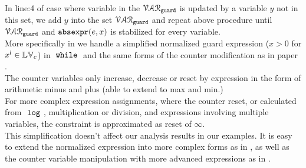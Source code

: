   In line:4 of case where variable in the $\mathcal{VAR}_{\mathtt{guard}}$ is updated by a variable $y$ not in this set, we add $y$ into the set $\mathcal{VAR}_{\mathtt{guard}}$ and repeat 
  above procedure  until $\mathcal{VAR}_{\mathtt{guard}}$ and $\mathtt{abs}{\mathtt{expr}}(e, x)$ is stabilized for every variable.
  \\
More specifically in 
we handle a simplified normalized guard expression ($ x > 0$ for $x^l \in \mathbb{LV}_c$)
 in $\;\mathtt{while}\;$ and the same forms of the counter modification as in paper \cite{sinn2017complexity}.
\\
The counter variables only increase, decrease or reset by expression in the form of arithmetic minus and plus (able to extend to max and min.)
\\
For more complex expression assignments, where the counter reset, or calculated from $~\mathtt{log}~$, 
multiplication or division, and expressions involving multiple variables, the constraint is approximated as reset of $\infty$.
\\
This simplification doesn't affect our analysis results in our examples. It is easy to extend the normalized expression 
into more complex forms as in \cite{sinn2017complexity}, as well as the 
counter variable manipulation with more advanced expressions as in \cite{}.
